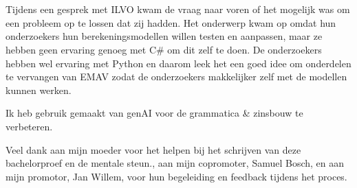 
\chapter*{}%
\label{ch:voorwoord}



Tijdens een gesprek met ILVO kwam de vraag naar voren of het mogelijk was om een probleem op te lossen
dat zij hadden. Het onderwerp kwam op omdat hun onderzoekers hun berekeningsmodellen willen testen en aanpassen, 
maar ze hebben geen ervaring genoeg met C\# om dit zelf te doen.
De onderzoekers hebben wel ervaring met Python en daarom leek het een goed idee om onderdelen te vervangen van EMAV
zodat de onderzoekers makkelijker zelf met de modellen kunnen werken.

Ik heb gebruik gemaakt van genAI voor de grammatica \& zinsbouw te verbeteren.

Veel dank aan mijn moeder voor het helpen bij het schrijven van deze bachelorproef en de mentale steun.,
aan mijn copromoter, Samuel Bosch, en aan mijn promotor, Jan Willem, voor hun begeleiding en feedback tijdens het proces.

